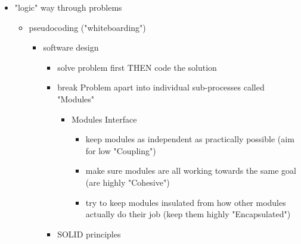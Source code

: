 \documentclass[11pt]{article}
\begin{document}
\begin{itemize}
\item "logic" way through problems
\begin{itemize}
\item pseudocoding ("whiteboarding")
\begin{itemize}
\item software design
\begin{itemize}
\item solve problem first THEN code the solution
\item break Problem apart into individual sub-processes called "Modules"
\begin{itemize}
\item Modules Interface
\begin{itemize}
\item keep modules as independent as practically possible (aim for low "Coupling")
\item make sure modules are all working towards the same goal (are highly "Cohesive")
\item try to keep modules insulated from how other modules actually do 
their job (keep them highly "Encapsulated")
\end{itemize}
\end{itemize}
\item SOLID principles
\end{itemize}
\end{itemize}


\end{itemize}
\end{itemize}
\end{document}
